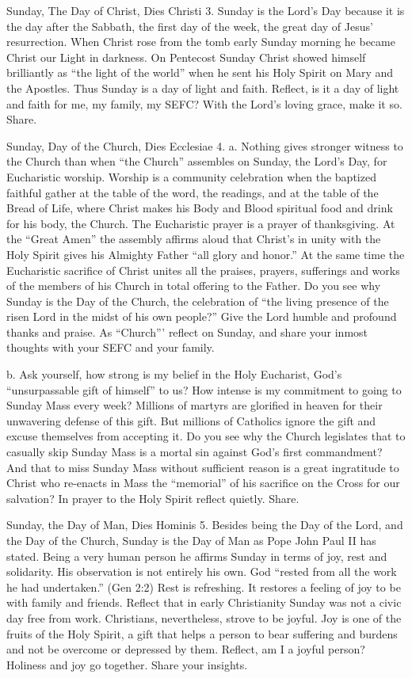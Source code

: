 \documentclass[oneside]{book}
\begin{document}
Sunday, The Day of Christ, Dies Christi
3. Sunday is the Lord's Day because it is the day after the Sabbath, the first
day of the week, the great day of Jesus' resurrection. When Christ rose from the
tomb early Sunday morning he became Christ our Light in darkness. On Pentecost
Sunday Christ showed himself brilliantly as ``the light of the world'' when he
sent his Holy Spirit on Mary and the Apostles. Thus Sunday is a day of light and
faith. Reflect, is it a day of light and faith for me, my family, my SEFC? With
the Lord's loving grace, make it so. Share.

Sunday, Day of the Church, Dies Ecclesiae
4. a. Nothing gives stronger witness to the Church than when ``the Church''
assembles on Sunday, the Lord's Day, for Eucharistic worship. Worship is a
community celebration when the baptized faithful gather at the table of the
word, the readings, and at the table of the Bread of Life, where Christ makes
his Body and Blood spiritual food and drink for his body, the Church. The
Eucharistic prayer is a prayer of thanksgiving. At the ``Great Amen'' the
assembly affirms aloud that Christ's in unity with the Holy Spirit gives his
Almighty Father ``all glory and honor.'' At the same time the Eucharistic
sacrifice of Christ unites all the praises, prayers, sufferings and works of the
members of his Church in total offering to the Father. Do you see why Sunday is
the Day of the Church, the celebration of ``the living presence of the risen
Lord in the midst of his own people?'' Give the Lord humble and profound thanks
and praise. As ``Church''' reflect on Sunday, and share your inmost thoughts
with your SEFC and your family.

b. Ask yourself, how strong is my belief in the Holy Eucharist, God's
``unsurpassable gift of himself'' to us? How intense is my commitment to going
to Sunday Mass every week? Millions of martyrs are glorified in heaven for their
unwavering defense of this gift. But millions of Catholics ignore the gift and
excuse themselves from accepting it. Do you see why the Church legislates that
to casually skip Sunday Mass is a mortal sin against God's first commandment?
And that to miss Sunday Mass without sufficient reason is a great ingratitude to
Christ who re-enacts in Mass the ``memorial'' of his sacrifice on the Cross for
our salvation? In prayer to the Holy Spirit reflect quietly. Share.

Sunday, the Day of Man, Dies Hominis
5. Besides being the Day of the Lord, and the Day of the Church, Sunday is the
Day of Man as Pope John Paul II has stated. Being a very human person he affirms
Sunday in terms of joy, rest and solidarity. His observation is not entirely his
own. God ``rested from all the work he had undertaken.'' (Gen 2:2) Rest is
refreshing. It restores a feeling of joy to be with family and friends. Reflect
that in early Christianity Sunday was not a civic day free from
work. Christians, nevertheless, strove to be joyful. Joy is one of the fruits of
the Holy Spirit, a gift that helps a person to bear suffering and burdens and
not be overcome or depressed by them. Reflect, am I a joyful person? Holiness
and joy go together. Share your insights.
\end{document}
